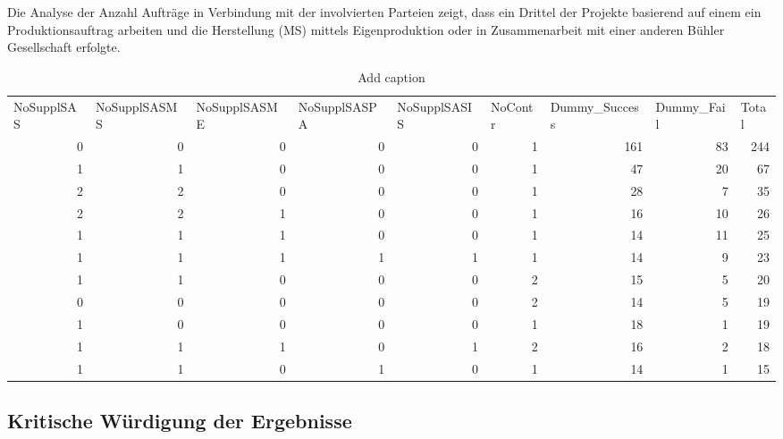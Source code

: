 \newline Die Analyse der Anzahl Aufträge in Verbindung mit der involvierten Parteien zeigt, dass ein Drittel der Projekte basierend auf einem ein Produktionsauftrag arbeiten und die Herstellung (MS) mittels Eigenproduktion oder in Zusammenarbeit mit einer anderen Bühler Gesellschaft erfolgte.
\begin{table}[htbp]
	\centering
	\caption{Add caption}
	\begin{tabular}{rrrrrrrrr}
		\multicolumn{1}{l}{NoSupplSAS} & \multicolumn{1}{l}{NoSupplSASMS} & \multicolumn{1}{l}{NoSupplSASME} & \multicolumn{1}{l}{NoSupplSASPA} & \multicolumn{1}{l}{NoSupplSASIS} & \multicolumn{1}{l}{NoContr} & \multicolumn{1}{l}{Dummy\_Success} & \multicolumn{1}{l}{Dummy\_Fail} & \multicolumn{1}{l}{Total} \\
		0     & 0     & 0     & 0     & 0     & 1     & 161   & 83    & 244 \\
		1     & 1     & 0     & 0     & 0     & 1     & 47    & 20    & 67 \\
		2     & 2     & 0     & 0     & 0     & 1     & 28    & 7     & 35 \\
		2     & 2     & 1     & 0     & 0     & 1     & 16    & 10    & 26 \\
		1     & 1     & 1     & 0     & 0     & 1     & 14    & 11    & 25 \\
		1     & 1     & 1     & 1     & 1     & 1     & 14    & 9     & 23 \\
		1     & 1     & 0     & 0     & 0     & 2     & 15    & 5     & 20 \\
		0     & 0     & 0     & 0     & 0     & 2     & 14    & 5     & 19 \\
		1     & 0     & 0     & 0     & 0     & 1     & 18    & 1     & 19 \\
		1     & 1     & 1     & 0     & 1     & 2     & 16    & 2     & 18 \\
		1     & 1     & 0     & 1     & 0     & 1     & 14    & 1     & 15 \\
	\end{tabular}%
	\label{tab:addlabel}%
\end{table}%
\newpage
\subsection{Kritische Würdigung der Ergebnisse}
\newpage	
	


